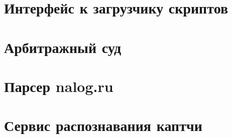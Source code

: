 \documentclass[letterpaper,10pt,russian]{sphinxmanual}
\begin{document}
\chapter{Интерфейс к загрузчику скриптов}
\label{\detokenize{script_interface::doc}}\label{\detokenize{script_interface:id1}}

\chapter{Арбитражный суд}
\label{\detokenize{arbitr::doc}}\label{\detokenize{arbitr:id1}}

\chapter{Парсер nalog.ru}
\label{\detokenize{nalog:nalog-ru}}\label{\detokenize{nalog::doc}}

\chapter{Сервис распознавания каптчи}
\label{\detokenize{captchatypers::doc}}\label{\detokenize{captchatypers:id1}}


\renewcommand{\indexname}{Алфавитный указатель}
\printindex
\end{document}
